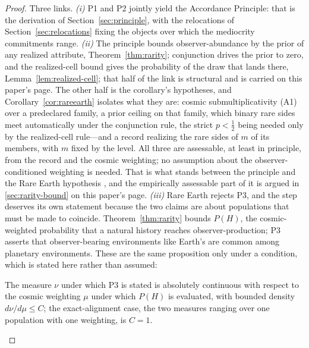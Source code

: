 \begin{proof}
Three links. \emph{(i)} P1 and P2 jointly yield the Accordance Principle: that is the derivation of Section~\ref{sec:principle}, with the relocations of Section~\ref{sec:relocations} fixing the objects over which the mediocrity commitments range. \emph{(ii)} The principle bounds observer-abundance by the prior of any realized attribute, Theorem~\ref{thm:rarity}; conjunction drives the prior to zero, and the realized-cell bound gives the probability of the draw that lands there, Lemma~\ref{lem:realized-cell}; that half of the link is structural and is carried on this paper's page. The other half is the corollary's hypotheses, and Corollary~\ref{cor:rareearth} isolates what they are: cosmic submultiplicativity (A1) over a predeclared family, a prior ceiling on that family, which binary rare sides meet automatically under the conjunction rule, the strict $p < \tfrac12$ being needed only by the realized-cell rule---and a record realizing the rare sides of $m$ of its members, with $m$ fixed by the level. All three are assessable, at least in principle, from the record and the cosmic weighting; no assumption about the observer-conditioned weighting is needed. That is what stands between the principle and the Rare Earth hypothesis \cite{ward2000rare}, and the empirically assessable part of it is argued in \autoref{sec:rarity-bound} on this paper's page. \emph{(iii)} Rare Earth rejects P3, and the step deserves its own statement because the two claims are about populations that must be made to coincide. Theorem~\ref{thm:rarity} bounds $P(H)$, the cosmic-weighted probability that a natural history reaches observer-production; P3 asserts that observer-bearing environments like Earth's are common among planetary environments. These are the same proposition only under a condition, which is stated here rather than assumed:
\begin{description}[leftmargin=3.2em, style=nextline]
\item[(Pop) Population alignment.] The measure $\nu$ under which P3 is stated is absolutely continuous with respect to the cosmic weighting $\mu$ under which $P(H)$ is evaluated, with bounded density $d\nu/d\mu \le C$; the exact-alignment case, the two measures ranging over one population with one weighting, is $C = 1$.
\end{description}

\end{proof}
